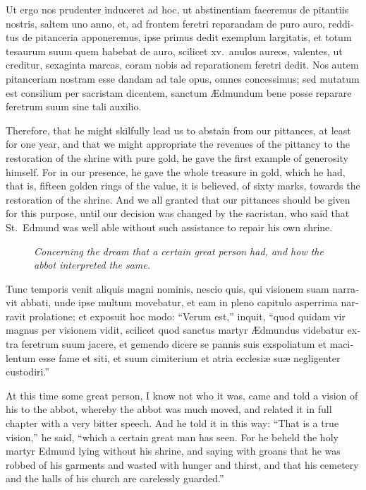 \documentclass[10pt]{book}
\newcommand{\blockhead}[4][]{
\begin{figure}
\centering
\vspace{#4}
\parbox{2.75cm}{\begin{center}\footnotesize \color{BrickRed} \emph{#2}\\ #1 \end{center}}
\end{figure}
}
\begin{document}
\begin{paracol}{2}
\switchcolumn*

\begin{otherlanguage}{latin}
Ut ergo nos prudenter induceret ad hoc, ut abstinentiam faceremus de pitantiis nostris, saltem uno anno, et, ad frontem feretri reparandam de puro auro, redditus de pitanceria apponeremus, ipse primus dedit exemplum largitatis, et totum tesaurum suum quem habebat de auro, scilicet xv.\ anulos aureos, valentes, ut creditur, sexaginta marcas, coram nobis ad reparationem feretri dedit. Nos autem pitanceriam nostram esse dandam ad tale opus, omnes concessimus; sed mutatum est consilium per sacristam dicentem, sanctum \AE{}dmundum bene posse reparare feretrum suum sine tali auxilio.
\end{otherlanguage}

\switchcolumn

Therefore, that he might skilfully lead us to abstain from our pittances, at least for one year, and that we might appropriate the revenues of the pittancy to the restoration of the shrine with pure gold, he gave the first example of generosity himself. For in our presence, he gave the whole treasure in gold, which he had, that is, fifteen golden rings of the value, it is believed, of sixty marks, towards the restoration of the shrine. And we all granted that our pittances should be given for this purpose, until our decision was changed by the sacristan, who said that St.\ Edmund was well able without such assistance to repair his own shrine.

\switchcolumn*

\begin{otherlanguage}{latin}
\blockhead{Concerning the dream that a certain great person had, and how the abbot interpreted the same.}{4}{-.65cm}
Tunc temporis venit aliquis magni nominis, nescio quis, qui visionem suam narravit abbati, unde ipse multum movebatur, et eam in pleno capitulo asperrima narravit prolatione; et exposuit hoc modo: ``Verum est,'' inquit, ``quod quidam vir magnus per visionem vidit, scilicet quod sanctus martyr \AE{}dmundus videbatur extra feretrum suum jacere, et gemendo dicere se pannis suis exspoliatum et macilentum esse fame et siti, et suum cimiterium et atria ecclesi\ae{} su\ae{} negligenter custodiri.''

\end{otherlanguage}

\switchcolumn

At this time some great person, I know not who it was, came and told a vision of his to the abbot, whereby the abbot was much moved, and related it in full chapter with a very bitter speech. And he told it in this way: ``That is a true vision,'' he said, ``which a certain great man has seen. For he beheld the holy martyr Edmund lying without his shrine, and saying with groans that he was robbed of his garments and wasted with hunger and thirst, and that his cemetery and the halls of his church are carelessly guarded.''


\end{paracol}
\end{document}
